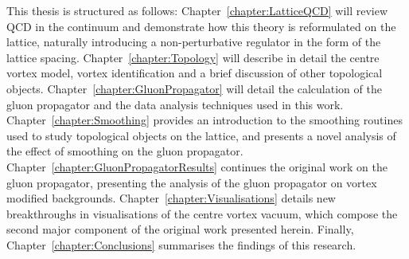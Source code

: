 This thesis is structured as follows: Chapter~\ref{chapter:LatticeQCD} will review QCD in the continuum and demonstrate how this theory is reformulated on the lattice, naturally introducing a non-perturbative regulator in the form of the lattice spacing. Chapter~\ref{chapter:Topology} will describe in detail the centre vortex model, vortex identification and a brief discussion of other topological objects. Chapter~\ref{chapter:GluonPropagator} will detail the calculation of the gluon propagator and the data analysis techniques used in this work. Chapter~\ref{chapter:Smoothing} provides an introduction to the smoothing routines used to study topological objects on the lattice, and presents a novel analysis of the effect of smoothing on the gluon propagator. Chapter~\ref{chapter:GluonPropagatorResults} continues the original work on the gluon propagator, presenting the analysis of the gluon propagator on vortex modified backgrounds. Chapter~\ref{chapter:Visualisations} details new breakthroughs in visualisations of the centre vortex vacuum, which compose the second major component of the original work presented herein. Finally, Chapter~\ref{chapter:Conclusions} summarises the findings of this research.